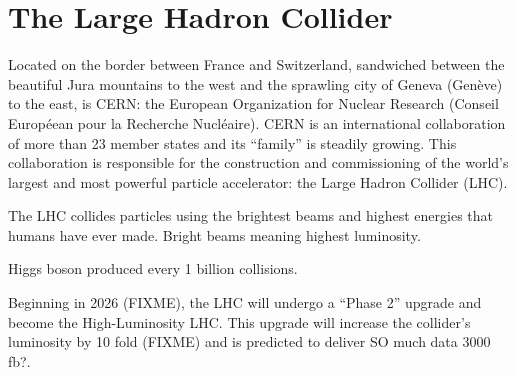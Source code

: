 \chapter{The Large Hadron Collider}  %
\label{ch:lhc}

Located on the border between France and Switzerland, sandwiched between the beautiful Jura mountains to the west and the sprawling city of Geneva (Genève) to the east, is CERN:
the European Organization for Nuclear Research 
(Conseil Européean pour la Recherche Nucléaire).
CERN is an international collaboration of more than 23 member states and its ``family'' is steadily growing.
This collaboration is responsible for the construction and commissioning of the world's largest and most powerful particle accelerator:
the Large Hadron Collider (LHC).

The LHC collides particles using the brightest beams and highest energies that humans have ever made.
Bright beams meaning highest luminosity.

Higgs boson produced every 1 billion collisions.

Beginning in 2026 (FIXME), the LHC will undergo a ``Phase 2'' upgrade and become the High-Luminosity LHC.
This upgrade will increase the collider's luminosity by 10 fold (FIXME) and is predicted to deliver SO much data 3000 fb?.
